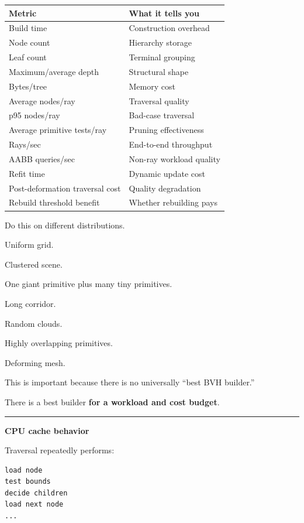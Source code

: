 {\def\LTcaptype{none} %
\begin{longtable}[]{@{}ll@{}}
\toprule\noalign{}
Metric & What it tells you \\
\midrule\noalign{}
\endhead
\bottomrule\noalign{}
\endlastfoot
Build time & Construction overhead \\
Node count & Hierarchy storage \\
Leaf count & Terminal grouping \\
Maximum/average depth & Structural shape \\
Bytes/tree & Memory cost \\
Average nodes/ray & Traversal quality \\
p95 nodes/ray & Bad-case traversal \\
Average primitive tests/ray & Pruning effectiveness \\
Rays/sec & End-to-end throughput \\
AABB queries/sec & Non-ray workload quality \\
Refit time & Dynamic update cost \\
Post-deformation traversal cost & Quality degradation \\
Rebuild threshold benefit & Whether rebuilding pays \\
\end{longtable}
}

Do this on different distributions.

Uniform grid.

Clustered scene.

One giant primitive plus many tiny primitives.

Long corridor.

Random clouds.

Highly overlapping primitives.

Deforming mesh.

This is important because there is no universally ``best BVH builder.''

There is a best builder \textbf{for a workload and cost budget}.

\begin{center}\rule{0.5\linewidth}{0.5pt}\end{center}

\textbf{CPU cache behavior}

Traversal repeatedly performs:

\begin{verbatim}
load node
test bounds
decide children
load next node
...
\end{verbatim}

